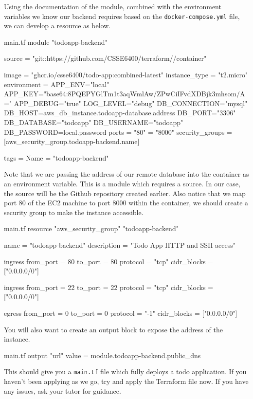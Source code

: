 \documentclass{csse4400}
\begin{document}
Using the documentation of the module,
combined with the environment variables we know our backend requires based on the \texttt{docker-compose.yml} file,
we can develop a resource as below.

\begin{code}[language=terraform]{main.tf}
module "todoapp-backend" {
  source = "git::https://github.com/CSSE6400/terraform//container"
  
  image = "ghcr.io/csse6400/todo-app:combined-latest"
  instance_type = "t2.micro"
  environment = {
    APP_ENV="local"
    APP_KEY="base64:8PQEPYGlTm1t3aqWmlAw/ZPwCiIFvdXDBjk3mhsom/A="
    APP_DEBUG="true"
    LOG_LEVEL="debug"
    DB_CONNECTION="mysql"
    DB_HOST=aws_db_instance.todoapp-database.address
    DB_PORT="3306"
    DB_DATABASE="todoapp"
    DB_USERNAME="todoapp"
    DB_PASSWORD=local.password
  }
  ports = {
    "80" = "8000"
  }
  security_groups = [aws_security_group.todoapp-backend.name]

  tags = {
    Name = "todoapp-backend"
  }
}
\end{code}

Note that we are passing the address of our remote database into the container as an environment variable.
This is a module which requires a source.
In our case, the source will be the Github repository created earlier.
Also notice that we map port 80 of the EC2 machine to port 8000 within the container,
we should create a security group to make the instance accessible.

\begin{code}[language=terraform]{main.tf}
resource "aws_security_group" "todoapp-backend" {
  name = "todoapp-backend"
  description = "Todo App HTTP and SSH access"

  ingress {
    from_port = 80
    to_port = 80
    protocol = "tcp"
    cidr_blocks = ["0.0.0.0/0"]
  }

  ingress {
    from_port = 22
    to_port = 22
    protocol = "tcp"
    cidr_blocks = ["0.0.0.0/0"]
  }

  egress {
    from_port = 0
    to_port = 0
    protocol = "-1"
    cidr_blocks = ["0.0.0.0/0"]
  }
}
\end{code}

You will also want to create an output block to expose the address of the instance.
  
\begin{code}[language=terraform]{main.tf}
output "url" {
  value = module.todoapp-backend.public_dns
}
\end{code}

This should give you a \texttt{main.tf} file which fully deploys a todo application.
If you haven't been applying as we go,
try and apply the Terraform file now.
If you have any issues,
ask your tutor for guidance.



\end{document}
